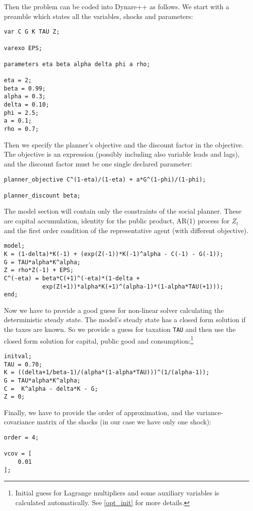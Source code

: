 \documentclass[10pt]{article}
\begin{document}
Then the problem can be coded into Dynare++ as follows. We start with
a preamble which states all the variables, shocks and parameters:
{\small
\begin{verbatim}
var C G K TAU Z;

varexo EPS;

parameters eta beta alpha delta phi a rho; 

eta = 2;
beta = 0.99;
alpha = 0.3;
delta = 0.10;
phi = 2.5;
a = 0.1;
rho = 0.7;
\end{verbatim}
}

Then we specify the planner's objective and the discount factor in the
objective. The objective is an expression (possibly including also
variable leads and lags), and the discount factor must be one single
declared parameter:
{\small
\begin{verbatim}
planner_objective C^(1-eta)/(1-eta) + a*G^(1-phi)/(1-phi);

planner_discount beta;
\end{verbatim}
}

The model section will contain only the constraints of the social
planner. These are capital accumulation, identity for the public
product, AR(1) process for $Z_t$ and the first order condition of the
representative agent (with different objective).
{\small
\begin{verbatim}
model;
K = (1-delta)*K(-1) + (exp(Z(-1))*K(-1)^alpha - C(-1) - G(-1));
G = TAU*alpha*K^alpha;
Z = rho*Z(-1) + EPS;
C^(-eta) = beta*C(+1)^(-eta)*(1-delta +
           exp(Z(+1))*alpha*K(+1)^(alpha-1)*(1-alpha*TAU(+1)));
end;
\end{verbatim}
}

Now we have to provide a good guess for non-linear solver calculating
the deterministic steady state. The model's steady state has a closed
form solution if the taxes are known. So we provide a guess for
taxation {\tt TAU} and then use the closed form solution for capital,
public good and consumption:\footnote{Initial guess for Lagrange
multipliers and some auxiliary variables is calculated automatically. See
\ref{opt_init} for more details.}
{\small
\begin{verbatim}
initval;
TAU = 0.70;
K = ((delta+1/beta-1)/(alpha*(1-alpha*TAU)))^(1/(alpha-1));
G = TAU*alpha*K^alpha;
C =  K^alpha - delta*K - G;
Z = 0;
\end{verbatim}
}

Finally, we have to provide the order of approximation, and the
variance-covariance matrix of the shocks (in our case we have only one
shock):
{\small
\begin{verbatim}
order = 4;

vcov = [
	0.01
];
\end{verbatim}
}
\end{document}
